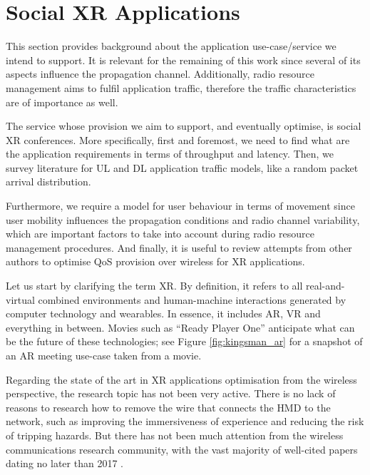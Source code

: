 \section{Social XR Applications}
\label{sec:sxr_applications}


This section provides background about the application use-case/service we intend to support. It is relevant for the remaining of this work since several of its aspects influence the propagation channel. Additionally, radio resource management aims to fulfil application traffic, therefore the traffic characteristics are of importance as well.

The service whose provision we aim to support, and eventually optimise, is social XR conferences. More specifically, first and foremost, we need to find what are the application requirements in terms of throughput and latency. Then, we survey literature for \ac{UL} and \ac{DL} application traffic models, like a random packet arrival distribution.

Furthermore, we require a model for user behaviour in terms of movement since user mobility influences the propagation conditions and radio channel variability, which are important factors to take into account during radio resource management procedures. And finally, it is useful to review attempts from other authors to optimise \ac{QoS} provision over wireless for XR applications.

Let us start by clarifying the term \ac{XR}. By definition, it refers to all real-and-virtual combined environments and human-machine interactions generated by computer technology and wearables. In essence, it includes \ac{AR}, \ac{VR} and everything in between. Movies such as ``Ready Player One'' \cite{readyPlayerOne} anticipate what can be the future of these technologies; see Figure \ref{fig:kingsman_ar} for a snapshot of an AR meeting use-case taken from a movie.



Regarding the state of the art in XR applications optimisation from the wireless perspective, the research topic has not been very active. There is no lack of reasons to research how to remove the wire that connects the \ac{HMD} to the network, such as improving the immersiveness of experience and reducing the risk of tripping hazards. But there has not been much attention from the wireless communications research community, with the vast majority of well-cited papers dating no later than 2017 \cite{9112752}.

